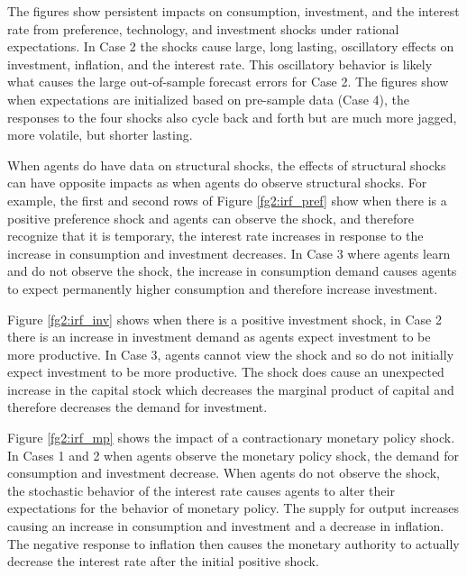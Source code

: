 {The figures show persistent impacts on consumption, investment, and the interest rate from preference, technology, and investment shocks under rational expectations.  In Case 2 the shocks cause large, long lasting, oscillatory effects on investment, inflation, and the interest rate.  This oscillatory behavior is likely what causes the large out-of-sample forecast errors for Case 2.  The figures show when expectations are initialized based on pre-sample data (Case 4), the responses to the four shocks also cycle back and forth but are much more jagged, more volatile, but shorter lasting.

When agents do have data on structural shocks, the effects of structural shocks can have opposite impacts as when agents do observe structural shocks.  For example, the first and second rows of Figure \ref{fg2:irf_pref} show when there is a positive preference shock and agents can observe the shock, and therefore recognize that it is temporary, the interest rate increases in response to the increase in consumption and investment decreases.  In Case 3 where agents learn and do not observe the shock, the increase in consumption demand causes agents to expect permanently higher consumption and therefore increase investment.  

Figure \ref{fg2:irf_inv} shows when there is a positive investment shock, in Case 2 there is an increase in investment demand as agents expect investment to be more productive.  In Case 3, agents cannot view the shock and so do not initially expect investment to be more productive.  The shock does cause an unexpected increase in the capital stock which decreases the marginal product of capital and therefore decreases the demand for investment.  

Figure \ref{fg2:irf_mp} shows the impact of a contractionary monetary policy shock.  In Cases 1 and 2 when agents observe the monetary policy shock, the demand for consumption and investment decrease.  When agents do not observe the shock, the stochastic behavior of the interest rate causes agents to alter their expectations for the behavior of monetary policy.  The supply for output increases causing an increase in consumption and investment and a decrease in inflation.  The negative response to inflation then causes the monetary authority to actually decrease the interest rate after the initial positive shock.

}
